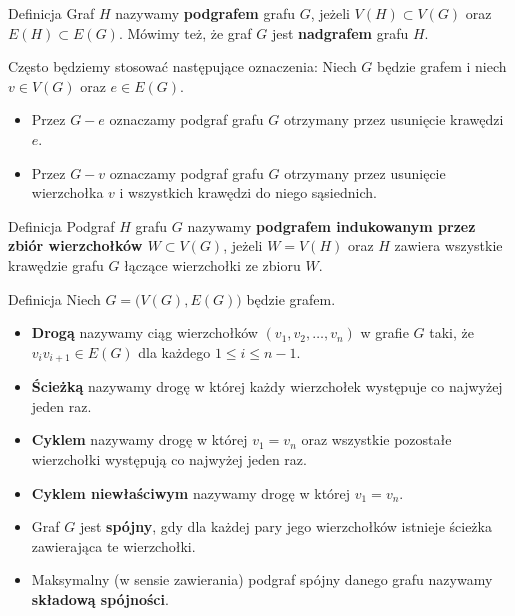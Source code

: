 \documentclass[a4paper,10pt]{beamer}
\begin{document}
\begin{frame}
	
	\begin{block}{Definicja}
		Graf $H$ nazywamy {\bf podgrafem} grafu $G$, jeżeli $V(H)\subset V(G)$ oraz $E(H)\subset E(G)$. Mówimy też, że graf $G$ jest {\bf nadgrafem} grafu $H$.
	\end{block}

\bigskip

\begin{block}{Często będziemy stosować następujące oznaczenia:}
Niech $G$ będzie grafem i niech $v\in V(G)$ oraz $e\in E(G)$.
\begin{itemize}
\item Przez $G-e$ oznaczamy podgraf grafu $G$ otrzymany przez usunięcie krawędzi~$e$.
\item Przez $G-v$ oznaczamy podgraf grafu $G$ otrzymany przez usunięcie wierzchołka $v$ i wszystkich krawędzi do niego sąsiednich.
\end{itemize}
\end{block}

\bigskip

	\begin{block}{Definicja}
		Podgraf $H$ grafu $G$ nazywamy {\bf podgrafem indukowanym przez zbiór wierzchołków $W\subset V(G)$}, jeżeli $W=V(H)$ oraz $H$ zawiera wszystkie krawędzie grafu $G$ łączące wierzchołki ze zbioru $W$.
	\end{block}


	
\end{frame}	



\begin{frame}
	
	\begin{block}{Definicja}
		Niech $G=\big(V(G),E(G)\big)$ będzie grafem.
		\begin{itemize}
			\item {\bf Drogą} nazywamy ciąg wierzchołków $(v_1,v_2,\ldots,v_n)$ w grafie $G$ taki, że $v_iv_{i+1}\in E(G)$ dla każdego $1\leq i\leq n-1$.
			\item {\bf Ścieżką} nazywamy drogę w której każdy wierzchołek występuje co najwyżej jeden raz.
			\item {\bf Cyklem} nazywamy drogę w której $v_1=v_n$ oraz wszystkie pozostałe wierzchołki występują co najwyżej jeden raz.
			\item {\bf Cyklem niewłaściwym} nazywamy drogę w której $v_1=v_n$.
			\item Graf $G$ jest {\bf spójny}, gdy dla każdej pary jego wierzchołków istnieje ścieżka zawierająca te wierzchołki.
			\item Maksymalny (w sensie zawierania) podgraf spójny danego grafu nazywamy {\bf składową spójności}.
		\end{itemize}
	\end{block}
	
\end{frame}
\end{document}
